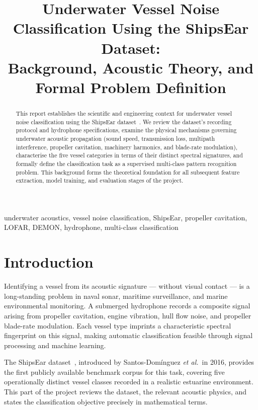 \documentclass[conference]{IEEEtran}
\title{Underwater Vessel Noise Classification Using the ShipsEar Dataset:\\
       Background, Acoustic Theory, and Formal Problem Definition}
\author{
  \IEEEauthorblockN{Author Name(s)}
  \IEEEauthorblockA{
    \textit{Department / Lab Name}\\
    \textit{Institution Name}\\
    City, Country\\
    email@institution.edu
  }
}
\begin{document}
\maketitle

% 
\begin{abstract}
This report establishes the scientific and engineering context for underwater
vessel noise classification using the ShipsEar dataset~\cite{shipsear2016}.
We review the dataset's recording protocol and hydrophone specifications,
examine the physical mechanisms governing underwater acoustic propagation
(sound speed, transmission loss, multipath interference, propeller cavitation,
machinery harmonics, and blade-rate modulation), characterise the five vessel
categories in terms of their distinct spectral signatures, and formally define
the classification task as a supervised multi-class pattern recognition
problem. This background forms the theoretical foundation for all subsequent
feature extraction, model training, and evaluation stages of the project.
\end{abstract}

\begin{IEEEkeywords}
underwater acoustics, vessel noise classification, ShipsEar, propeller
cavitation, LOFAR, DEMON, hydrophone, multi-class classification
\end{IEEEkeywords}

% 
\section{Introduction}

Identifying a vessel from its acoustic signature --- without visual contact ---
is a long-standing problem in naval sonar, maritime surveillance, and marine
environmental monitoring. A submerged hydrophone records a composite signal
arising from propeller cavitation, engine vibration, hull flow noise, and
propeller blade-rate modulation. Each vessel type imprints a characteristic
spectral fingerprint on this signal, making automatic classification feasible
through signal processing and machine learning.

The ShipsEar dataset~\cite{shipsear2016}, introduced by Santos-Dom\'inguez
\textit{et al.}\ in 2016, provides the first publicly available benchmark
corpus for this task, covering five operationally distinct vessel classes
recorded in a realistic estuarine environment. This part of the project
reviews the dataset, the relevant acoustic physics, and states the
classification objective precisely in mathematical terms.
\end{document}
